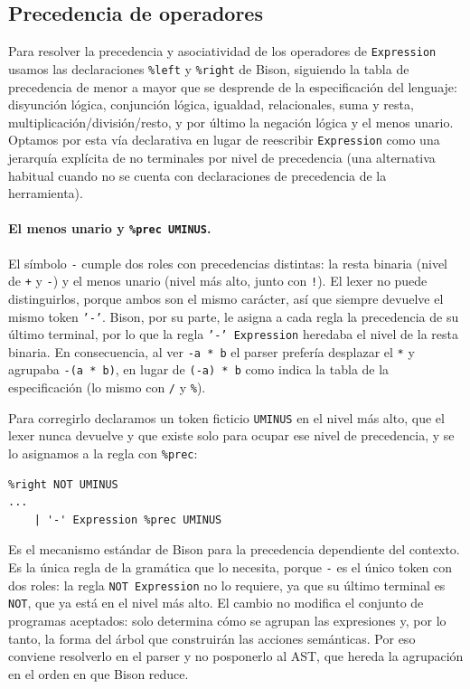 \documentclass[11pt,a4paper]{article}
\begin{document}
\subsection{Precedencia de operadores}

Para resolver la precedencia y asociatividad de los operadores de
\texttt{Expression} usamos las declaraciones \texttt{\%left} y
\texttt{\%right} de Bison, siguiendo la tabla de precedencia de menor a mayor
que se desprende de la especificación del lenguaje: disyunción lógica,
conjunción lógica, igualdad, relacionales, suma y resta,
multiplicación/división/resto, y por último la negación lógica y el menos
unario. Optamos por esta vía declarativa en lugar de reescribir
\texttt{Expression} como una jerarquía explícita de no terminales por nivel
de precedencia (una alternativa habitual cuando no se cuenta con
declaraciones de precedencia de la herramienta).

\paragraph{El menos unario y \texttt{\%prec UMINUS}.} El símbolo \texttt{-}
cumple dos roles con precedencias distintas: la resta binaria (nivel de
\texttt{+} y \texttt{-}) y el menos unario (nivel más alto, junto con
\texttt{!}). El lexer no puede distinguirlos, porque ambos son el mismo
carácter, así que siempre devuelve el mismo token \texttt{'-'}. Bison, por su
parte, le asigna a cada regla la precedencia de su último terminal, por lo que
la regla \texttt{'-' Expression} heredaba el nivel de la resta binaria. En
consecuencia, al ver \texttt{-a * b} el parser prefería desplazar el
\texttt{*} y agrupaba \texttt{-(a * b)}, en lugar de \texttt{(-a) * b} como
indica la tabla de la especificación (lo mismo con \texttt{/} y \texttt{\%}).

Para corregirlo declaramos un token ficticio \texttt{UMINUS} en el nivel más
alto, que el lexer nunca devuelve y que existe solo para ocupar ese nivel de
precedencia, y se lo asignamos a la regla con \texttt{\%prec}:

\begin{verbatim}
%right NOT UMINUS
...
    | '-' Expression %prec UMINUS
\end{verbatim}

Es el mecanismo estándar de Bison para la precedencia dependiente del contexto.
Es la única regla de la gramática que lo necesita, porque \texttt{-} es el
único token con dos roles: la regla \texttt{NOT Expression} no lo requiere,
ya que su último terminal es \texttt{NOT}, que ya está en el nivel más alto.
El cambio no modifica el conjunto de programas aceptados: solo determina cómo
se agrupan las expresiones y, por lo tanto, la forma del árbol que construirán
las acciones semánticas. Por eso conviene resolverlo en el parser y no
posponerlo al AST, que hereda la agrupación en el orden en que Bison reduce.
\end{document}

